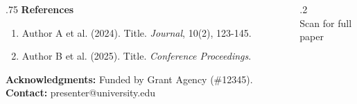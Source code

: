 \documentclass[final,t]{beamer}
\begin{document}
\begin{frame}[t]
  \begin{block}{}
    \footnotesize
    \begin{columns}[T]
      \begin{column}{.75\linewidth}
        \textbf{References}
        \begin{enumerate}
          \item Author A et al. (2024). Title. \textit{Journal}, 10(2), 123-145.
          \item Author B et al. (2025). Title. \textit{Conference Proceedings}.
        \end{enumerate}
        \vspace{0.3cm}
        \textbf{Acknowledgments:} Funded by Grant Agency (\#12345).
        \vspace{0.3cm}
        \textbf{Contact:} presenter@university.edu
      \end{column}
      \begin{column}{.2\linewidth}
        \centering
        \\
        \tiny Scan for full paper
      \end{column}
    \end{columns}
  \end{block}

\end{frame}
\end{document}
